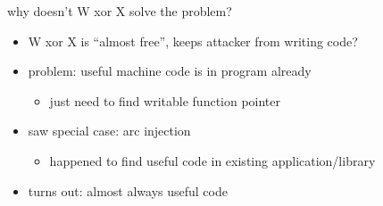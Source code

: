 \begin{frame}{why doesn't W xor X solve the problem?}
    \begin{itemize}
    \item W xor X is ``almost free'', keeps attacker from writing code?
    \item problem: useful machine code is in program already
        \begin{itemize}
        \item just need to find writable function pointer
        \end{itemize}
    \item saw special case: arc injection
        \begin{itemize}
        \item happened to find useful code in existing application/library
        \end{itemize}
    \item turns out: almost always useful code
    \end{itemize}
\end{frame}
